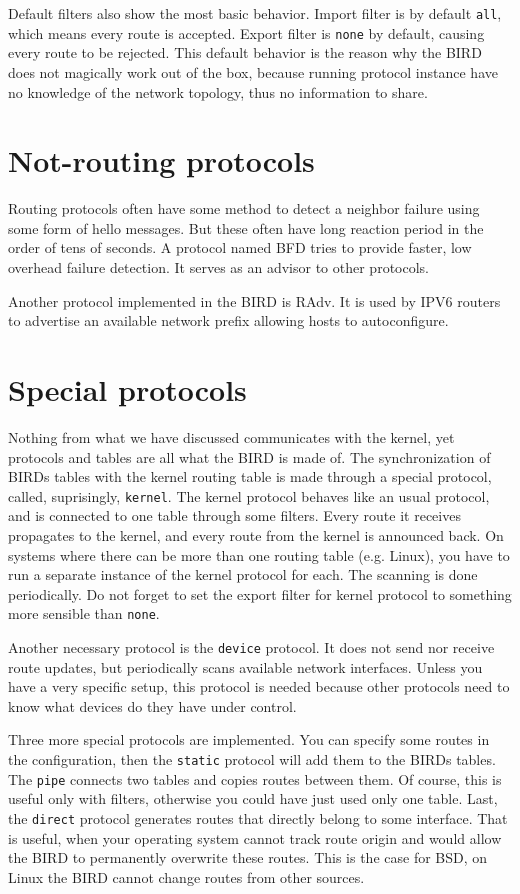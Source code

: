 Default filters also show the most basic behavior. Import filter is by default
\texttt{all}, which means every route is accepted. Export filter is
\texttt{none} by default, causing every route to be rejected. This default
behavior is the reason why the BIRD does not magically work out of the box,
because running protocol instance have no knowledge of the network topology,
thus no information to share.

\section{Not-routing protocols}
Routing protocols often have some method to detect a neighbor failure using
some form of hello messages. But these often have long reaction period in the
order of tens of seconds. A protocol named BFD tries to provide faster, low
overhead failure detection. It serves as an advisor to other protocols.

Another protocol implemented in the BIRD is RAdv. It is used by IPV6 routers to
advertise an available network prefix allowing hosts to autoconfigure.

\section{Special protocols}
Nothing from what we have discussed communicates with the kernel, yet protocols
and tables are all what the BIRD is made of. The synchronization of BIRDs
tables with the kernel routing table is made through a special protocol,
called, suprisingly, \texttt{kernel}. The kernel protocol behaves like an usual
protocol, and is connected to one table through some filters. Every route it
receives propagates to the kernel, and every route from the kernel is announced
back. On systems where there can be more than one routing table (e.g. Linux),
you have to run a separate instance of the kernel protocol for each. The
scanning is done periodically. Do not forget to set the export filter for
kernel protocol to something more sensible than \texttt{none}.

Another necessary protocol is the \texttt{device} protocol. It does not send
nor receive route updates, but periodically scans available network interfaces.
Unless you have a very specific setup, this protocol is needed because other
protocols need to know what devices do they have under control.

Three more special protocols are implemented. You can specify some routes in
the configuration, then the \texttt{static} protocol will add them to the BIRDs
tables. The \texttt{pipe} connects two tables and copies routes between
them. Of course, this is useful only with filters, otherwise you could have
just used only one table. Last, the \texttt{direct} protocol generates routes
that directly belong to some interface. That is useful, when your operating
system cannot track route origin and would allow the BIRD to permanently
overwrite these routes. This is the case for BSD, on Linux the BIRD cannot
change routes from other sources.

